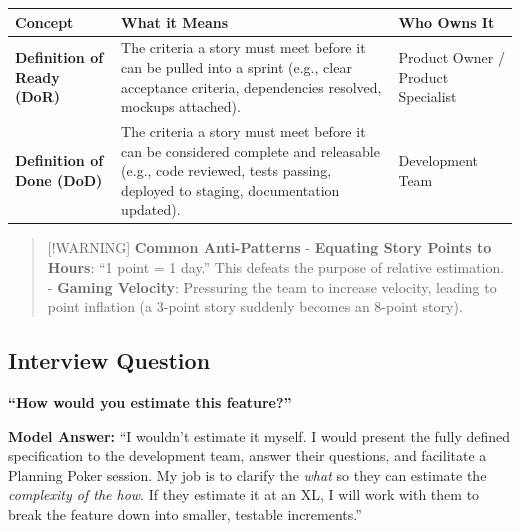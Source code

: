 \begin{longtable}[]{@{}
  >{\raggedright\arraybackslash}p{}
  >{\raggedright\arraybackslash}p{}
  >{\raggedright\arraybackslash}p{}@{}}
\toprule\noalign{}
\begin{minipage}[b]{\linewidth}\raggedright
Concept
\end{minipage} & \begin{minipage}[b]{\linewidth}\raggedright
What it Means
\end{minipage} & \begin{minipage}[b]{\linewidth}\raggedright
Who Owns It
\end{minipage} \\
\midrule\noalign{}
\endhead
\bottomrule\noalign{}
\endlastfoot
\textbf{Definition of Ready (DoR)} & The criteria a story must meet
before it can be pulled into a sprint (e.g., clear acceptance criteria,
dependencies resolved, mockups attached). & Product Owner / Product
Specialist \\
\textbf{Definition of Done (DoD)} & The criteria a story must meet
before it can be considered complete and releasable (e.g., code
reviewed, tests passing, deployed to staging, documentation updated). &
Development Team \\
\end{longtable}

\begin{quote}
{[}!WARNING{]} \textbf{Common Anti-Patterns} - \textbf{Equating Story
Points to Hours}: ``1 point = 1 day.'' This defeats the purpose of
relative estimation. - \textbf{Gaming Velocity}: Pressuring the team to
increase velocity, leading to point inflation (a 3-point story suddenly
becomes an 8-point story).
\end{quote}

\subsection{Interview Question}\label{interview-question}

\textbf{``How would you estimate this feature?''}

\textbf{Model Answer:} ``I wouldn't estimate it myself. I would present
the fully defined specification to the development team, answer their
questions, and facilitate a Planning Poker session. My job is to clarify
the \emph{what} so they can estimate the \emph{complexity of the how}.
If they estimate it at an XL, I will work with them to break the feature
down into smaller, testable increments.''

